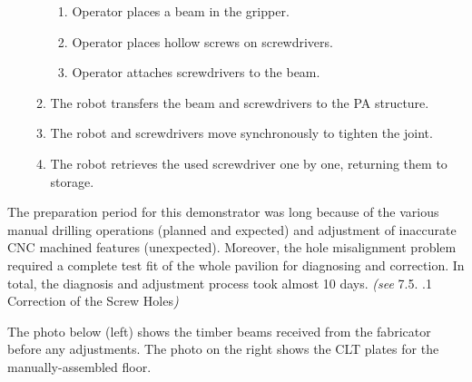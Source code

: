 \documentclass[11pt]{book}
\begin{document}
\begin{enumerate}
\begin{enumerate}
\begin{enumerate}
	\item Operator places a beam in the gripper.

	\item Operator places hollow screws on screwdrivers.

	\item Operator attaches screwdrivers to the beam.

\end{enumerate}
	\item The robot transfers the beam and screwdrivers to the PA structure.

	\item The robot and screwdrivers move synchronously to tighten the joint.

	\item The robot retrieves the used screwdriver one by one, returning them to storage.

\end{enumerate}
\end{enumerate}
The preparation period for this demonstrator was long because of the various manual drilling operations (planned and expected) and adjustment of inaccurate CNC machined features (unexpected). Moreover, the hole misalignment problem required a complete test fit of the whole pavilion for diagnosing and correction. In total, the diagnosis and adjustment process took almost 10 days. \textit{(see }7.5. \cite{no_auth_4}.1 Correction of the Screw Holes\textit{)}

 The photo below (left) shows the timber beams received from the fabricator before any adjustments. The photo on the right shows the CLT plates for the manually-assembled floor.
\end{document}
